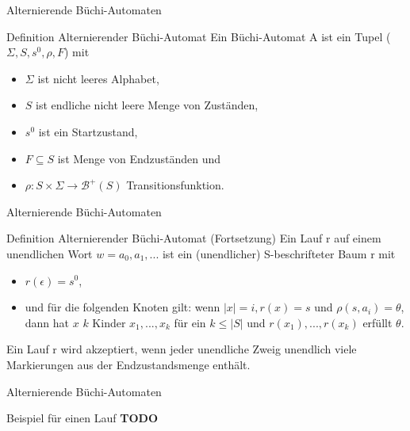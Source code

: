 \begin{frame}{Alternierende Büchi-Automaten}
\begin{block}{Definition Alternierender Büchi-Automat}
Ein Büchi-Automat A ist ein Tupel ($\Sigma, S, s^0, \rho, F$) mit
\begin{itemize}
\item $\Sigma$ ist nicht leeres Alphabet,
\item $S$ ist endliche nicht leere Menge von Zuständen,
\item $s^0$ ist ein Startzustand,
\item $F\subseteq S$ ist Menge von Endzuständen und
\item \textbf{$\rho : S \times \Sigma \rightarrow \mathcal{B}^+(S)$} Transitionsfunktion.
\end{itemize}
\end{block}
\end{frame}

\begin{frame}{Alternierende Büchi-Automaten}
\begin{block}{Definition Alternierender Büchi-Automat (Fortsetzung)}
Ein Lauf r auf einem unendlichen Wort $w=a_0,a_1,...$ ist ein (unendlicher) S-beschrifteter Baum r mit
\begin{itemize}
\item $r(\epsilon)=s^0$,
\item und für die folgenden Knoten gilt: wenn $|x|=i, r(x)=s$ und $\rho(s,a_i)=\theta$, dann hat $x$ $k$ Kinder $x_1,...,x_k$ für ein $k \leq |S|$ und $r(x_1),...,r(x_k)$ erfüllt $\theta$.
\end{itemize}
Ein Lauf r wird akzeptiert, wenn jeder unendliche Zweig unendlich viele Markierungen aus der Endzustandsmenge enthält.
\end{block}
\end{frame}

\begin{frame}{Alternierende Büchi-Automaten}
\begin{block}{Beispiel für einen Lauf}
\textbf{TODO}
\end{block}
\end{frame}
